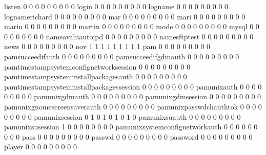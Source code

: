\documentclass[compress,8pt]{beamer}
\begin{document}
\begin{frame}
\begin{Schunk}
  listen                                     0   0   0   0   0   0   0   0   0
  login                                      0   0   0   0   0   0   0   0   0
  logname                                    0   0   0   0   0   0   0   0   0
  lognamerichard                             0   0   0   0   0   0   0   0   0
  mar                                        0   0   0   0   0   0   0   0   0
  mari                                       0   0   0   0   0   0   0   0   0
  marin                                      0   0   0   0   0   0   0   0   0
  martin                                     0   0   0   0   0   0   0   0   0
  mode                                       0   0   0   0   0   0   0   0   0
  mysql                                      0   0   0   0   0   0   0   0   0
  nameavahiautoipd                           0   0   0   0   0   0   0   0   0
  namesftptest                               0   0   0   0   0   0   0   0   0
  news                                       0   0   0   0   0   0   0   0   0
  nov                                        1   1   1   1   1   1   1   1   1
  pam                                        0   0   0   0   0   0   0   0   0
  pamsucceedifauth                           0   0   0   0   0   0   0   0   0
  pamsucceedifgdmauth                        0   0   0   0   0   0   0   0   0
  pamtimestampsystemconfignetworksession     0   0   0   0   0   0   0   0   0
  pamtimestampsysteminstallpackagesauth      0   0   0   0   0   0   0   0   0
  pamtimestampsysteminstallpackagessession   0   0   0   0   0   0   0   0   0
  pamunixauth                                0   0   0   0   0   0   0   0   0
  pamunixgdmauth                             0   0   0   0   0   0   0   0   0
  pamunixgdmsession                          0   0   0   0   0   0   0   0   0
  pamunixgnomescreensaverauth                0   0   0   0   0   0   0   0   0
  pamunixpasswdchauthtok                     0   0   0   0   0   0   0   0   0
  pamunixsession                             0   1   0   1   0   1   0   1   0
  pamunixsuauth                              0   0   0   0   0   0   0   0   0
  pamunixsusession                           1   0   0   0   0   0   0   0   0
  pamunixsystemconfignetworkauth             0   0   0   0   0   0   0   0   0
  pass                                       0   0   0   0   0   0   0   0   0
  passwd                                     0   0   0   0   0   0   0   0   0
  password                                   0   0   0   0   0   0   0   0   0
  player                                     0   0   0   0   0   0   0   0   0

\end{Schunk}
\end{frame}
\end{document}
